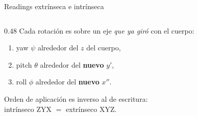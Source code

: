 \documentclass[11pt]{beamer}
\begin{document}
\begin{frame}{Readings extrínseca e intrínseca}
\begin{columns}[T]
\begin{column}{0.48\textwidth}
    \smallskip
    Cada rotación es sobre un eje \emph{que ya giró} con el cuerpo:
    \begin{enumerate}\small
      \item yaw \(\psi\) alrededor del \(z\) del cuerpo,
      \item pitch \(\theta\) alrededor del \textbf{nuevo} \(y'\),
      \item roll \(\phi\) alrededor del \textbf{nuevo} \(x''\).
    \end{enumerate}

    \smallskip

    \smallskip
    {\footnotesize Orden de aplicación es inverso al de escritura:\\
    intrínseco ZYX \(=\) extrínseco XYZ.}
  \end{column}

\end{columns}

\vfill

\end{frame}


\end{document}
